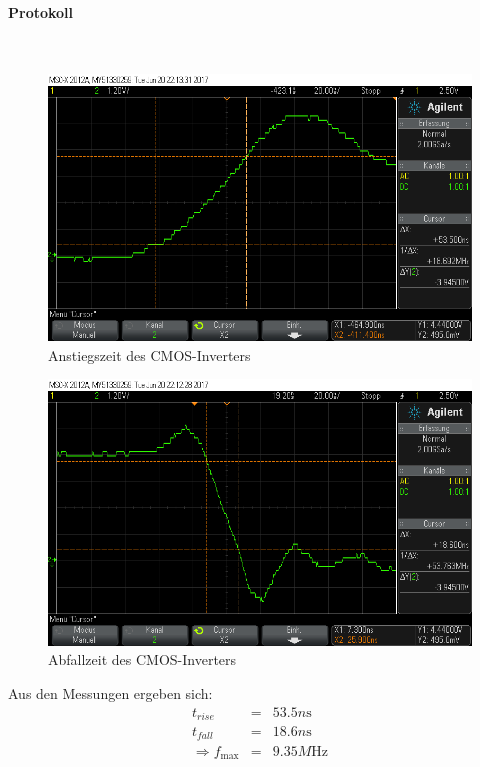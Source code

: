 \documentclass[10pt]{scrreprt}
\begin{document}
    \paragraph{Protokoll}
    $ $
    \begin{figure}[H]
        \includegraphics[width=\textwidth]{scope_8.png}
        \caption{Anstiegszeit des CMOS-Inverters}
    \end{figure}
    \begin{figure}[H]
        \includegraphics[width=\textwidth]{scope_7.png}
        \caption{Abfallzeit des CMOS-Inverters}
    \end{figure}

    Aus den Messungen ergeben sich:
    \begin{eqnarray*}
        t_{rise} &=& 53.5\si{n\second}\\
        t_{fall} &=& 18.6\si{n\second}\\
        \Rightarrow f_{\max} &=& 9.35\si{M\hertz}
    \end{eqnarray*}
\end{document}

